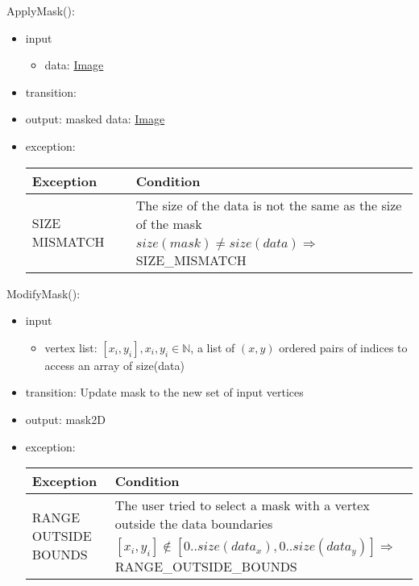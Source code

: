 \documentclass[12pt, titlepage]{article}
\begin{document}
\noindent ApplyMask():
\begin{itemize}
    \item input
    \begin{itemize}
        \item data: \hyperref[Mod:Image]{Image}
    \end{itemize}
    \item transition:
    \item output: masked data: \hyperref[Mod:Image]{Image}
    \item exception:
    \begin{center}
        \begin{tabular}{p{3.5cm} p{12cm}}
            \toprule[0.15em]
            \textbf{Exception} & \textbf{Condition}\\
            \midrule[0.1em]
            \multirow{2}{0.25\textwidth}{SIZE MISMATCH} & The size of the data
            is not the same as the size of the mask\\ 
            & $size(mask) \neq size(data) \Rightarrow$ SIZE\_MISMATCH\\ 
            \bottomrule[0.15em]
        \end{tabular}
    \end{center}
\end{itemize}

\noindent ModifyMask():
\begin{itemize}
    \item input
    \begin{itemize}
        \item vertex list: $[x_i, y_i], x_i, y_i \in \mathbb{N}$, a list of
        $(x,y)$ ordered pairs of indices to access an array of size(data)
    \end{itemize}
    \item transition: Update mask to the new set of input vertices
    \item output: mask2D
    \item exception:
    \begin{center}
        \begin{tabular}{p{3.5cm} p{12cm}}
            \toprule[0.15em]
            \textbf{Exception} & \textbf{Condition}\\
            \midrule[0.1em]
            \multirow{2}{0.25\textwidth}{RANGE OUTSIDE BOUNDS} & The user tried
            to select a mask with a vertex outside the data boundaries\\ 
            & $[x_i, y_i] \notin [0..size(data_x), 0..size(data_y)] \Rightarrow$
            RANGE\_OUTSIDE\_BOUNDS\\ 
            \bottomrule[0.15em]
        \end{tabular}
    \end{center}
\end{itemize}
\end{document}
